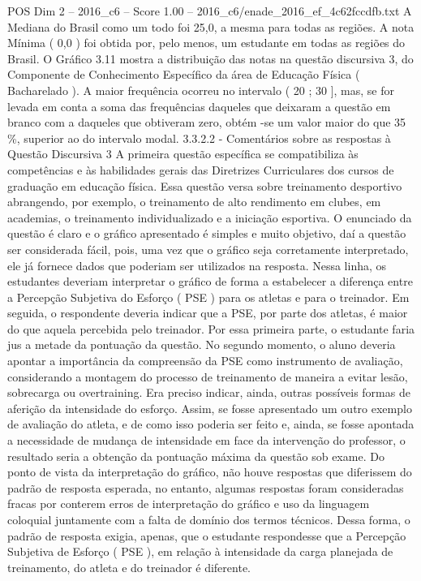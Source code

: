 \begin{textsample}{POS Dim 2 – 2016\_c6 – Score 1.00 – 2016\_c6/enade\_2016\_ef\_4c62fccdfb.txt}
A Mediana do Brasil como um todo foi 25,0, a mesma para todas as regiões.
A nota Mínima ( 0,0 ) foi obtida por, pelo menos, um estudante em todas as regiões do Brasil.
O Gráfico 3.11 mostra a distribuição das notas na questão discursiva 3, do Componente de Conhecimento Específico da área de Educação Física ( Bacharelado ).
A maior frequência ocorreu no intervalo ( 20 ; 30 ], mas, se for levada em conta a soma das frequências daqueles que deixaram a questão em branco com a daqueles que obtiveram zero, obtém -se um valor maior do que 35 \%, superior ao do intervalo modal. 3.3.2.2 - Comentários sobre as respostas à Questão Discursiva 3 A primeira questão específica se compatibiliza às competências e às habilidades gerais das Diretrizes Curriculares dos cursos de graduação em educação física.
Essa questão versa sobre treinamento desportivo abrangendo, por exemplo, o treinamento de alto rendimento em clubes, em academias, o treinamento individualizado e a iniciação esportiva.
O enunciado da questão é claro e o gráfico apresentado é simples e muito objetivo, daí a questão ser considerada fácil, pois, uma vez que o gráfico seja corretamente interpretado, ele já fornece dados que poderiam ser utilizados na resposta.
Nessa linha, os estudantes deveriam interpretar o gráfico de forma a estabelecer a diferença entre a Percepção Subjetiva do Esforço ( PSE ) para os atletas e para o treinador.
Em seguida, o respondente deveria indicar que a PSE, por parte dos atletas, é maior do que aquela percebida pelo treinador.
Por essa primeira parte, o estudante faria jus a metade da pontuação da questão.
No segundo momento, o aluno deveria apontar a importância da compreensão da PSE como instrumento de avaliação, considerando a montagem do processo de treinamento de maneira a evitar lesão, sobrecarga ou overtraining.
Era preciso indicar, ainda, outras possíveis formas de aferição da intensidade do esforço.
Assim, se fosse apresentado um outro exemplo de avaliação do atleta, e de como isso poderia ser feito e, ainda, se fosse apontada a necessidade de mudança de intensidade em face da intervenção do professor, o resultado seria a obtenção da pontuação máxima da questão sob exame.
Do ponto de vista da interpretação do gráfico, não houve respostas que diferissem do padrão de resposta esperada, no entanto, algumas respostas foram consideradas fracas por conterem erros de interpretação do gráfico e uso da linguagem coloquial juntamente com a falta de domínio dos termos técnicos.
Dessa forma, o padrão de resposta exigia, apenas, que o estudante respondesse que a Percepção Subjetiva de Esforço ( PSE ), em relação à intensidade da carga planejada de treinamento, do atleta e do treinador é diferente.

\end{textsample}
